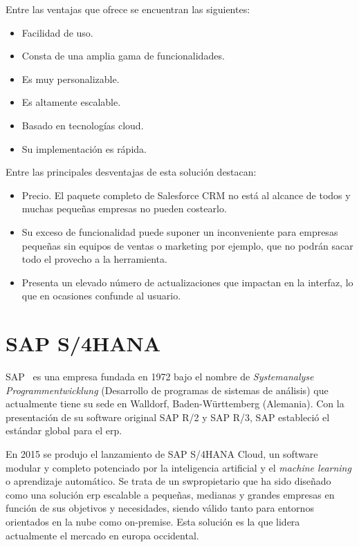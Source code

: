 Entre las ventajas que ofrece se encuentran las siguientes:

\begin{itemize}
\item Facilidad de uso.
\item Consta de una amplia gama de funcionalidades.
\item Es muy personalizable.
\item Es altamente escalable.
\item Basado en tecnologías cloud.
\item Su implementación es rápida.
\end{itemize}

Entre las principales desventajas de esta solución destacan:

\begin{itemize}
\item Precio. El paquete completo de Salesforce CRM no está al alcance de todos y muchas pequeñas empresas no pueden costearlo.
\item Su exceso de funcionalidad puede suponer un inconveniente para empresas pequeñas sin equipos de ventas o marketing por ejemplo, que no podrán sacar todo el provecho a la herramienta.
\item Presenta un elevado número de actualizaciones que impactan en la interfaz, lo que en ocasiones confunde al usuario.
\end{itemize}


\section{SAP S/4HANA}
\label{sec:estado-arte-sap}

SAP~\citep{SAP} es una empresa fundada en 1972 bajo el nombre de \textit{Systemanalyse Programmentwicklung} (Desarrollo de programas de sistemas de análisis) que actualmente tiene su sede en Walldorf, Baden-Württemberg (Alemania). Con la presentación de su software original SAP R/2 y SAP R/3, SAP estableció el estándar global para el \acrlong{erp}.

En 2015 se produjo el lanzamiento de SAP S/4HANA Cloud, un software modular y completo potenciado por la inteligencia artificial y el \textit{machine learning} o aprendizaje automático. Se trata de un \gls{swpropietario} que ha sido diseñado como una solución \acrshort{erp} escalable a pequeñas, medianas y grandes empresas en función de sus objetivos y necesidades, siendo válido tanto para entornos orientados en la nube como on-premise. Esta solución es la que lidera actualmente el mercado en europa occidental. \newline

